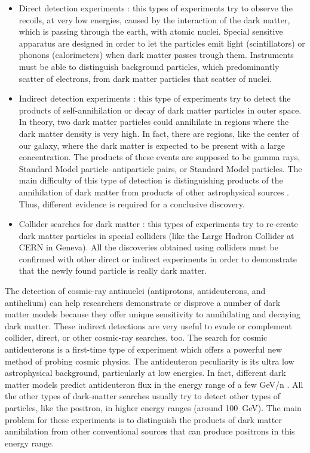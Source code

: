 \begin{itemize}
    \itemsep0em
    \item Direct detection experiments \cite{feng_2010_dark}: this types of experiments try to observe the recoils, at very low energies, caused by the interaction of the dark matter, which is passing through the earth, with atomic nuclei. Special sensitive apparatus are designed in order to let the particles emit light (scintillators) or phonons (calorimeters) when dark matter passes trough them. Instruments must be able to distinguish background particles, which predominantly scatter of electrons, from dark matter particles that scatter of nuclei.
    \item Indirect detection experiments \cite{feng_2010_dark}: this type of experiments try to detect the products of self-annihilation or decay of dark matter particles in outer space. In theory, two dark matter particles could annihilate in regions where the dark matter density is very high. In fact, there are regions, like the center of our galaxy, where the dark matter is expected to be present with a large concentration. The products of these events are supposed to be gamma rays, Standard Model particle–antiparticle pairs, or Standard Model particles. The main difficulty of this type of detection is distinguishing products of the annihilation of dark matter from products of other astrophysical sources \cite{doetinchem_2020_cosmicray}. Thus, different evidence is required for a conclusive discovery.
    \item Collider searches for dark matter \cite{feng_2010_dark}: this types of experiments try to re-create dark matter particles in special colliders (like the Large Hadron Collider at CERN in Geneva). All the discoveries obtained using colliders must be confirmed with other direct or indirect experiments in order to demonstrate that the newly found particle is really dark matter.
\end{itemize}

The detection of cosmic-ray antinuclei (antiprotons, antideuterons, and antihelium) can
help researchers demonstrate or disprove a number of dark matter models because they
offer unique sensitivity to annihilating and decaying dark matter. These indirect detections
are very useful to evade or complement collider, direct, or other cosmic-ray searches,
too. The search for cosmic antideuterons is a first-time type of experiment which offers a
powerful new method of probing cosmic physics. The antideuteron peculiarity is its ultra low
astrophysical background, particularly at low energies. In fact, different dark matter
models predict antideuteron flux in the energy range of a few GeV/n \cite{doetinchem_2020_cosmicray}. All the other types of dark-matter searches usually try to detect other types of particles, like the positron, in higher energy ranges (around \SI{100}{\giga\electronvolt}). The main problem for these experiments is to distinguish the products of dark matter annihilation from other conventional sources that can produce positrons in this energy range.

